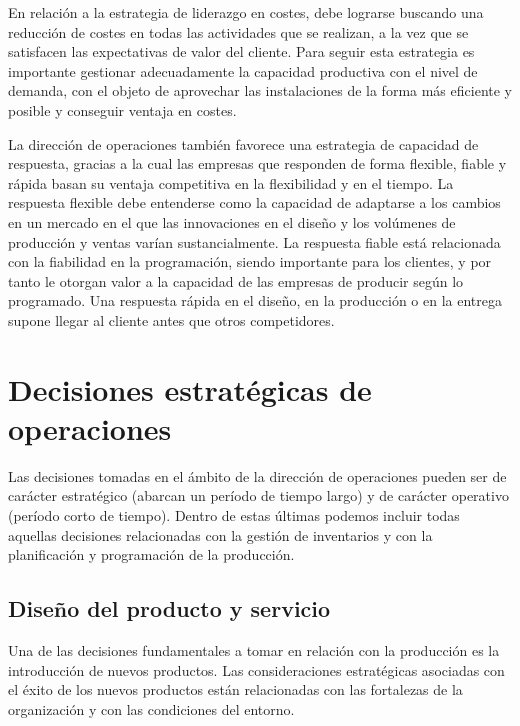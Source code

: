 \documentclass[10pt,a4paper,spanish]{report}
\begin{document}
                  En relación a la estrategia de liderazgo en costes, debe lograrse buscando una reducción de costes en todas las actividades que se realizan, a la vez que se satisfacen las expectativas de valor del cliente. Para seguir esta estrategia es importante gestionar adecuadamente la capacidad productiva con el nivel de demanda, con el objeto de aprovechar las instalaciones de la forma más eficiente y posible y conseguir ventaja en costes.

                  La dirección de operaciones también favorece una estrategia de capacidad de respuesta, gracias a la cual las empresas que responden de forma flexible, fiable y rápida basan su ventaja competitiva en la flexibilidad y en el tiempo. La respuesta flexible debe entenderse como la capacidad de adaptarse a los cambios en un mercado en el que las innovaciones en el diseño y los volúmenes de producción y ventas varían sustancialmente. La respuesta fiable está relacionada con la fiabilidad en la programación, siendo importante para los clientes, y por tanto le otorgan valor a la capacidad de las empresas de producir según lo programado. Una respuesta rápida en el diseño, en la producción o en la entrega supone llegar al cliente antes que otros competidores.

      \section{\textcolor[rgb]{0.9,0.7,0.6}Decisiones estratégicas de operaciones}

            Las decisiones tomadas en el ámbito de la dirección de operaciones pueden ser de carácter estratégico (abarcan un período de tiempo largo) y de carácter operativo (período corto de tiempo). Dentro de estas últimas podemos incluir todas aquellas decisiones relacionadas con la gestión de inventarios y con la planificación y programación de la producción.

            \subsection{\textcolor[rgb]{0.9,0.7,0.6}Diseño del producto y servicio}

                  Una de las decisiones fundamentales a tomar en relación con la producción es la introducción de nuevos productos. Las consideraciones estratégicas asociadas con el éxito de los nuevos productos están relacionadas con las fortalezas de la organización y con las condiciones del entorno.
\end{document}
